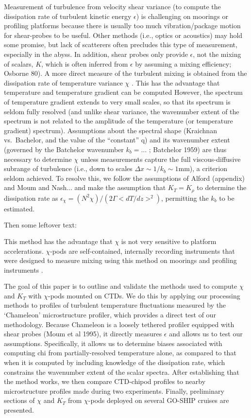 \documentclass{ametsoc}
\begin{document}
Measurement of turbulence from velocity shear variance (to compute the dissipation rate of turbulent kinetic energy $\epsilon$) is challenging on moorings or profiling platforms because there is usually too much vibration/package motion for shear-probes to be useful. Other methods (i.e., optics or acoustics) may hold some promise, but lack of scatterers often precludes this type of measurement, especially in the abyss.  In addition, shear probes only provide $\epsilon$, not the mixing of scalars, $K$, which is often inferred from $\epsilon$ by assuming a mixing efficiency; Osborne 80).  A more direct measure of the turbulent mixing is obtained from the dissipation rate of temperature variance $\chi$ \cite{osborncox72}.  This has the advantage that temperature and temperature gradient can be computed   However, the spectrum of temperature gradient extends to very small scales, so that its spectrum is seldom fully resolved (and unlike shear variance, the wavenumber extent of the spectrum is not related to the amplitude of the temperature (or temperature gradient) spectrum). Assumptions about the spectral shape (Kraichnan vs.\ Bachelor, and the value of the ``constant'' q) and its wavenumber extent (governed by the Batchelor wavenumber $k_b=$... ; Batchelor 1959) are thus necessary to determine $\chi$ unless measurements capture the full viscous-diffusive subrange of turbulence (i.e., down to scales $\Delta x \sim 1/k_b \sim 1$mm), a criterion seldom achieved.  To resolve this, we follow the assumptions of Alford (appendix) and Moum and Nash... and make the assumption that $K_T=K_{\rho}$ to determine the dissipation rate as $\epsilon_{\chi}=(N^2\chi)/(2\Gamma <dT/dz>^2)$, permitting the $k_b$ to be estimated. 

Then some leftover text:

This method has the advantage that $\chi$ is not very sensitive to platform accelerations. $\chi$-pods are self-contained, internally recording instruments that were designed to measure mixing using this method on moorings and profiling instruments \cite{moumnash09}.

The goal of this paper is to outline and validate the methods used to compute $\chi$ and $K_T$ with $\chi$-pods mounted on CTDs.  We do this by applying our processing methods to profiles of turbulent temperature fluctuations measured by the `Chameleon' microstructure profiler, which provides a direct test of our methodology.  Because Chameleon is a loosely tethered profiler equipped with shear probes (Moum et al 1995), it directly measures $\epsilon$ and allows us to test our assumptions.  Specifically, it allows us to determine biases associated with computing chi from partially-resolved temperature alone, as compared to that when it is computed by including knowledge of the dissipation rate, which constrains the wavenumber extent of the scalar spectra.   After establishing that the method works, we then compare CTD-chipod profiles to nearby microstructure profiles made during two experiments. Finally, preliminary sections of $\chi$ and $K_T$ from $\chi$-pods deployed on several GO-SHIP cruises are presented.
\end{document}
